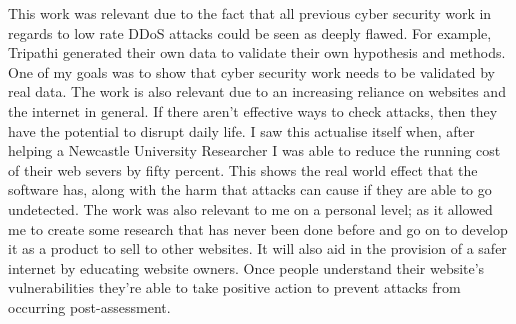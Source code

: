 This work was relevant due to the fact that all previous cyber security work in regards to low rate DDoS attacks could be seen as deeply flawed. For example, Tripathi generated their own data to validate their own hypothesis and methods. One of my goals was to show that cyber security work needs to be validated by real data. The work is also relevant due to an increasing reliance on websites and the internet in general. If there aren't effective ways to check attacks, then they have the potential to disrupt daily life. I saw this actualise itself when, after helping a Newcastle University Researcher I was able to reduce the running cost of their web severs by fifty percent. This shows the real world effect that the software has, along with the harm that attacks can cause if they are able to go undetected. The work was also relevant to me on a personal level; as it allowed me to create some research that has never been done before and go on to develop it as a product to sell to other websites. It will also aid in the provision of a safer internet by educating website owners. Once people understand their website's vulnerabilities they're able to take positive action to prevent attacks from occurring post-assessment.
